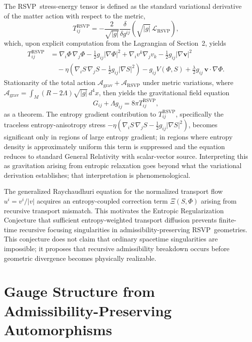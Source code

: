 \documentclass[12pt,a4paper]{article}
\newcommand{\RSVP}{\textrm{RSVP}}
\begin{document}
The \RSVP\ stress-energy tensor is defined as the standard variational
derivative of the matter action with respect to the metric,
\[
T^\RSVP_{ij}
= -\frac{2}{\sqrt{|g|}}\frac{\delta}{\delta g^{ij}}\!\left(\sqrt{|g|}\,\mathcal{L}_\RSVP\right),
\]
which, upon explicit computation from the Lagrangian of Section~2, yields
\begin{align*}
T^\RSVP_{ij}
&= \nabla_i\Phi\,\nabla_j\Phi
- \tfrac{1}{2}g_{ij}|\nabla\Phi|^2
+ \nabla_iv^k\nabla_jv_k
- \tfrac{1}{2}g_{ij}|\nabla\mathbf{v}|^2\\
&\quad
- \eta\!\left(\nabla_iS\,\nabla_jS-\tfrac{1}{2}g_{ij}|\nabla S|^2\right)
- g_{ij}V(\Phi,S)
+ \tfrac{\lambda}{2}g_{ij}\,\mathbf{v}\cdot\nabla\Phi.
\end{align*}
Stationarity of the total action $\mathcal{A}_\mathrm{grav}+\mathcal{A}_\RSVP$
under metric variations, where $\mathcal{A}_\mathrm{grav}=\int_M(R-2\Lambda)\sqrt{|g|}\,d^4x$,
then yields the gravitational field equation
\[
G_{ij} + \Lambda g_{ij} = 8\pi T^\RSVP_{ij},
\]
as a theorem. The entropy gradient contribution to $T^\RSVP_{ij}$, specifically
the traceless entropy-anisotropy stress
$-\eta(\nabla_iS\,\nabla_jS-\tfrac{1}{2}g_{ij}|\nabla S|^2)$,
becomes significant only in regions of large entropy gradient; in regions where
entropy density is approximately uniform this term is suppressed and the
equation reduces to standard General Relativity with scalar-vector source.
Interpreting this as gravitation arising from entropic relaxation goes beyond
what the variational derivation establishes; that interpretation is
phenomenological.

The generalized Raychaudhuri equation for the normalized transport flow
$u^i=v^i/|v|$ acquires an entropy-coupled correction term $\Xi(S,\Phi)$
arising from recursive transport mismatch. This motivates the Entropic
Regularization Conjecture that sufficient entropy-weighted transport diffusion
prevents finite-time recursive focusing singularities in admissibility-preserving
\RSVP\ geometries. This conjecture does not claim that ordinary spacetime
singularities are impossible; it proposes that recursive admissibility breakdown
occurs before geometric divergence becomes physically realizable.

\section{Gauge Structure from Admissibility-Preserving Automorphisms}
\end{document}
